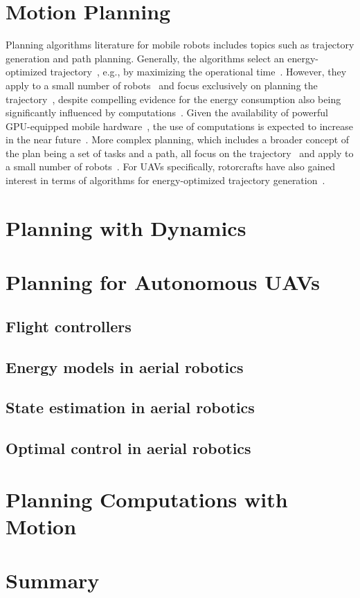 \section{Motion Planning}

Planning algorithms literature for mobile robots includes topics such as trajectory generation and path planning. Generally, the algorithms select an energy-optimized trajectory~\cite{mei2004energy}, e.g., by maximizing the operational time~\cite{wahab2015energy}. However, they apply to a small number of robots~\cite{kim2005energy} and focus exclusively on planning the trajectory~\cite{kim2008minimum}, despite compelling evidence for the energy consumption also being significantly influenced by computations~\cite{mei2005case}. Given the availability of powerful GPU-equipped mobile hardware~\cite{rizvi2017general}, the use of computations is expected to increase in the near future~\cite{abramov2012real,satria2016real,jaramillo2019visual}. More complex planning, which includes a broader concept of the plan being a set of tasks and a path, all focus on the trajectory~\cite{mei2005case,mei2006deployment} and apply to a small number of robots~\cite{sadrpour2013mission,sadrpour2013experimental}. For UAVs specifically, rotorcrafts have also gained interest in terms of algorithms for energy-optimized trajectory generation~\cite{morbidi2016minimum,kreciglowa2017energy}. 


\section{Planning with Dynamics}


\section{Planning for Autonomous UAVs}

\subsection{Flight controllers}

\subsection{Energy models in aerial robotics}

\subsection{State estimation in aerial robotics}

\subsection{Optimal control in aerial robotics}


\section{Planning Computations with Motion}


\section{Summary}

